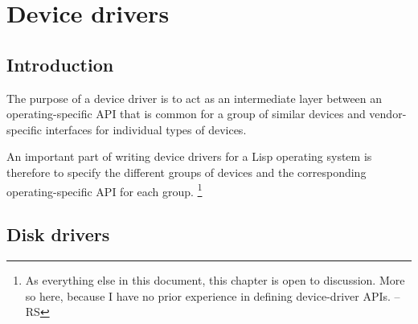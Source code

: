 \chapter{Device drivers}

\section{Introduction}

The purpose of a device driver is to act as an intermediate layer
between an operating-specific API that is common for a group of
similar devices and vendor-specific interfaces for individual types of
devices. 

An important part of writing device drivers for a Lisp operating
system is therefore to specify the different groups of devices and the
corresponding operating-specific API for each group.%
\footnote{As everything else in this document, this chapter is open to
  discussion.  More so here, because I have no prior experience in
  defining device-driver APIs. -- RS}

\section{Disk drivers}
